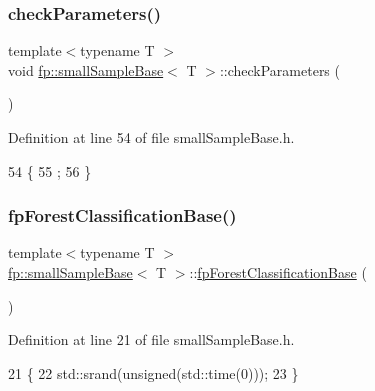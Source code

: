 \subsubsection{\texorpdfstring{check\+Parameters()}{checkParameters()}}
{\footnotesize\ttfamily template$<$typename T $>$ \\
void \hyperlink{classfp_1_1smallSampleBase}{fp\+::small\+Sample\+Base}$<$ T $>$\+::check\+Parameters (\begin{DoxyParamCaption}{ }\end{DoxyParamCaption})\hspace{0.3cm}{\ttfamily [inline]}}



Definition at line 54 of file small\+Sample\+Base.\+h.


\begin{DoxyCode}
54                                          \{
55                 ;
56             \}
\end{DoxyCode}
\mbox{\label{classfp_1_1smallSampleBase_aa461f7076060995f561c3afc32e713fa}} 
\subsubsection{\texorpdfstring{fp\+Forest\+Classification\+Base()}{fpForestClassificationBase()}}
{\footnotesize\ttfamily template$<$typename T $>$ \\
\hyperlink{classfp_1_1smallSampleBase}{fp\+::small\+Sample\+Base}$<$ T $>$\+::\hyperlink{classfp_1_1fpForestClassificationBase}{fp\+Forest\+Classification\+Base} (\begin{DoxyParamCaption}{ }\end{DoxyParamCaption})\hspace{0.3cm}{\ttfamily [inline]}}



Definition at line 21 of file small\+Sample\+Base.\+h.


\begin{DoxyCode}
21                                         \{
22                 std::srand(\textcolor{keywordtype}{unsigned}(std::time(0)));
23             \}
\end{DoxyCode}
\mbox{\label{classfp_1_1smallSampleBase_a8c5b6a0f2c8aeb32a322cc5e237c60af}} 
